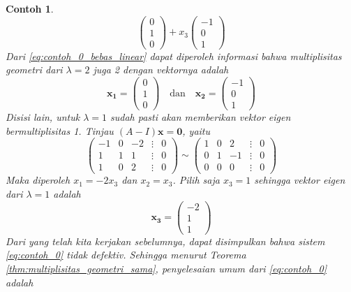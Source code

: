 \documentclass[a4paper]{article}
\theoremstyle{definisi}
\newtheorem{contoh}{Contoh}[section]
\numberwithin{equation}{section}
\begin{document}
\begin{contoh}
\begin{equation}
\begin{pmatrix}
        0\\1\\0
      \end{pmatrix}+x_3\begin{pmatrix}
        -1\\0\\1
      \end{pmatrix}
    \end{equation}
    Dari \eqref{eq:contoh_0_bebas_linear} dapat diperoleh informasi bahwa multiplisitas geometri dari $\lambda=2$ juga 2 dengan vektornya adalah
    \begin{equation*}
      \mathbf{x_1}=\begin{pmatrix}
        0\\1\\0
      \end{pmatrix}\quad\text{dan}\quad
      \mathbf{x_2}=\begin{pmatrix}
        -1\\0\\1
      \end{pmatrix}
    \end{equation*}
    Disisi lain, untuk $\lambda=1$ sudah pasti akan memberikan vektor eigen bermultiplisitas 1. Tinjau $(A-I)\mathbf{x}=\mathbf{0}$, yaitu
    \begin{equation*}
      \begin{pmatrix}
        -1&0&-2&\vdots&0\\
        1&1&1&\vdots&0\\
        1&0&2&\vdots&0
      \end{pmatrix}\sim
      \begin{pmatrix}
        1&0&2&\vdots&0\\
        0&1&-1&\vdots&0\\
        0&0&0&\vdots&0
      \end{pmatrix}
    \end{equation*}
    Maka diperoleh $x_1=-2x_3$ dan $x_2=x_3$. Pilih saja $x_3=1$ sehingga vektor eigen dari $\lambda=1$ adalah
    \begin{equation*}
      \mathbf{x_3}=\begin{pmatrix}
        -2\\1\\1
      \end{pmatrix}
    \end{equation*}
    Dari yang telah kita kerjakan sebelumnya, dapat disimpulkan bahwa sistem \eqref{eq:contoh_0} tidak \textit{defektiv}. Sehingga menurut Teorema \ref{thm:multiplisitas_geometri_sama}, penyelesaian umum dari \eqref{eq:contoh_0} adalah

\end{contoh}
\end{document}
